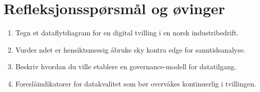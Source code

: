 \section{Refleksjonssp\o rsm\aa l og \o vinger}
\begin{enumerate}
    \item Tegn et dataflytdiagram for en digital tvilling i en norsk industribedrift.
    \item Vurder n\aar det er hensiktsmessig \aa bruke sky kontra edge for sanntidsanalyse.
    \item Beskriv hvordan du ville etablere en governance-modell for datatilgang.
    \item Foresl\aa indikatorer for datakvalitet som b\o r overv\aa kes kontinuerlig i tvillingen.
\end{enumerate}
